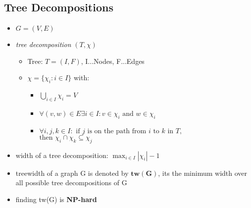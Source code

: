 \documentclass[12pt,a4paper]{article}
\begin{document}
\subsection{Tree Decompositions}
\begin{itemize}
\item $G=(V,E)$
\item \textit{tree decomposition} $(T, \chi)$\begin{itemize}
\item Tree: $T = (I,F)$, I...Nodes, F...Edges
\item $\chi = \{\chi_i :i\in I\}$ with:
\begin{itemize}
\item $\displaystyle \bigcup_{i\in I} \chi_i = V$
\item $\forall (v,w) \in E \exists i \in I : v \in \chi_i \text{ and } w \in \chi_i$
\item $\forall i,j,k\in I: \text{ if } j\text{ is on the path from } i \text{ to } k \text{ in } T,$\\$\text{then } \chi_i \cap \chi_k \subseteq \chi_j$
\end{itemize}
\end{itemize}
\item width of a tree decomposition: $\displaystyle \max_{i\in I} |\chi_i | -1$
\item treewidth of a graph G is denoted by $\mathbf{tw(G)}$, its the minimum width over all possible tree decompositions of G
\item finding tw(G) is \textbf{NP-hard}
\end{itemize}
\end{document}
